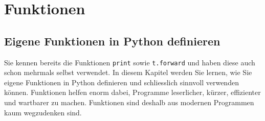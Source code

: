 \chapter{Funktionen}\label{ch:K04_Functions}

\section{Eigene Funktionen in Python definieren}

Sie kennen bereits die Funktionen \lstinline|print| sowie \lstinline|t.forward| und haben diese auch schon mehrmals selbst verwendet. In diesem Kapitel werden Sie lernen, wie Sie eigene Funktionen in Python definieren und schliesslich sinnvoll verwenden können. Funktionen helfen enorm dabei, Programme leserlicher, kürzer, effizienter und wartbarer zu machen. Funktionen sind deshalb aus modernen Programmen kaum wegzudenken sind.

